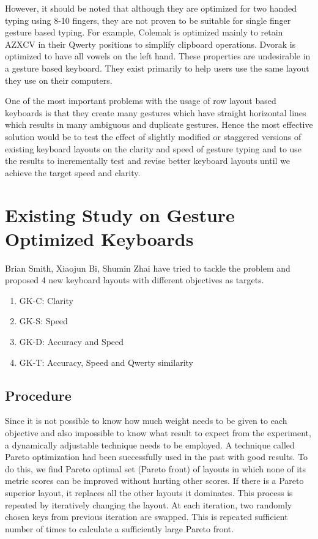 \documentclass[MTech]{iitmdiss}
\begin{document}
However, it should be noted that although they are optimized for two handed typing using 8-10 fingers, they are not proven to be suitable for single finger gesture based typing. For example, Colemak is optimized mainly to retain AZXCV in their Qwerty positions to simplify clipboard operations. Dvorak is optimized to have all vowels on the left hand. These properties are undesirable in a gesture based keyboard. They exist primarily to help users use the same layout they use on their computers.


One of the most important problems with the usage of row layout based keyboards is that they create many gestures which have straight horizontal lines which results in many ambiguous and duplicate gestures. Hence the most effective solution would be to test the effect of slightly modified or staggered versions of existing keyboard layouts on the clarity and speed of gesture typing and to use the results to incrementally test and revise better keyboard layouts until we achieve the target speed and clarity.


\section{Existing Study on Gesture Optimized Keyboards}
Brian Smith, Xiaojun Bi, Shumin Zhai \citet{gesturerecog} have tried to tackle the problem and proposed 4 new keyboard layouts with different objectives as targets.

\begin{enumerate}
	
	\item GK-C: Clarity
	\item GK-S: Speed
	\item GK-D: Accuracy and Speed
	\item GK-T: Accuracy, Speed and Qwerty similarity
\end{enumerate}


\subsection{Procedure}
Since it is not possible to know how much weight needs to be given to each objective and also impossible to know what result to expect from the experiment, a dynamically adjustable technique needs to be employed. A technique called Pareto optimization had been successfully used in the past with good results. To do this, we find Pareto optimal set (Pareto front) of layouts in which none of its metric scores can be improved without hurting other scores. If there is a Pareto superior layout, it replaces all the other layouts it dominates. This process is repeated by iteratively changing the layout. At each iteration, two randomly chosen keys from previous iteration are swapped. This is repeated sufficient number of times to calculate a sufficiently large Pareto front. 
\end{document}
